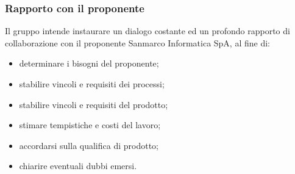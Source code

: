 	\subsubsection{Rapporto con il proponente}
	Il gruppo intende instaurare un dialogo costante ed un profondo rapporto di collaborazione con il proponente Sanmarco Informatica SpA, al fine di:
	\begin{itemize}
		\item determinare i bisogni del proponente;
		\item stabilire vincoli e  requisiti dei processi;
		\item stabilire vincoli e requisiti del prodotto;
		\item stimare tempistiche e costi del lavoro;
		\item accordarsi sulla qualifica di prodotto;
		\item chiarire eventuali dubbi emersi.
	\end{itemize}